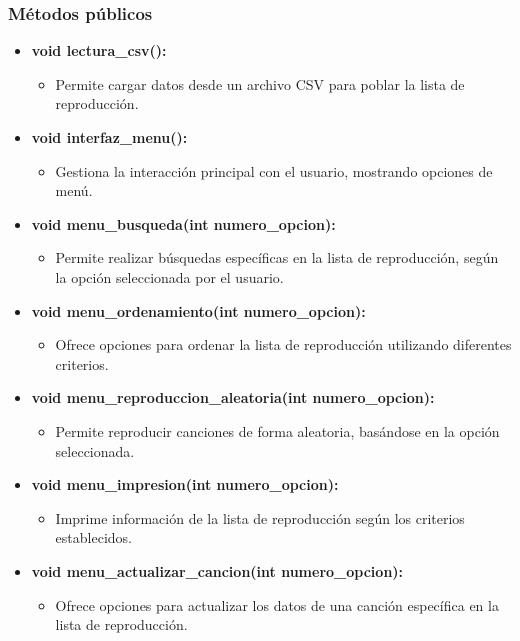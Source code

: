 \documentclass[corference]{IEEEtran}
\begin{document}
\begin{flushleft}
            \subsubsection{Métodos públicos}
                \begin{itemize}
                \item \textbf{void lectura\_csv():} 
                \begin{itemize}
                    \item Permite cargar datos desde un archivo CSV para poblar la lista de reproducción.
                \end{itemize}
                \item \textbf{void interfaz\_menu():} 
                \begin{itemize}
                    \item Gestiona la interacción principal con el usuario, mostrando opciones de menú.
                \end{itemize}
                \item \textbf{void menu\_busqueda(int numero\_opcion):} 
                \begin{itemize}
                    \item Permite realizar búsquedas específicas en la lista de reproducción, según la opción seleccionada por el usuario.
                \end{itemize}
                \item \textbf{void menu\_ordenamiento(int numero\_opcion):} 
                \begin{itemize}
                    \item Ofrece opciones para ordenar la lista de reproducción utilizando diferentes criterios.
                \end{itemize}
                \item \textbf{void menu\_reproduccion\_aleatoria(int numero\_opcion):} 
                \begin{itemize}
                    \item Permite reproducir canciones de forma aleatoria, basándose en la opción seleccionada.
                \end{itemize}
                \item \textbf{void menu\_impresion(int numero\_opcion):} 
                \begin{itemize}
                    \item Imprime información de la lista de reproducción según los criterios establecidos.
                \end{itemize}
                \item \textbf{void menu\_actualizar\_cancion(int numero\_opcion):} 
                \begin{itemize}
                    \item Ofrece opciones para actualizar los datos de una canción específica en la lista de reproducción.
                \end{itemize}
            \end{itemize}


\end{flushleft}
\end{document}
